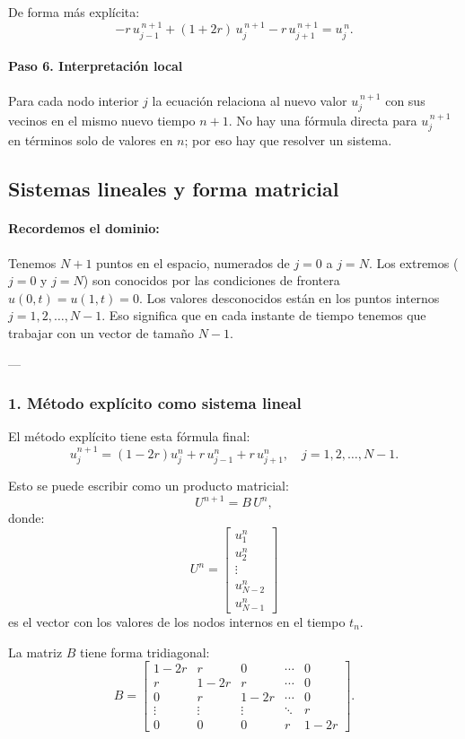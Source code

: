 \documentclass[12pt,a4paper]{article}
\begin{document}
De forma más explícita:
\[
-r\,u_{j-1}^{\,n+1} + (1+2r)\,u_j^{\,n+1} - r\,u_{j+1}^{\,n+1} = u_j^{\,n}.
\]

\paragraph{Paso 6. Interpretación local}  
Para cada nodo interior \(j\) la ecuación relaciona al nuevo valor \(u_j^{\,n+1}\) con sus vecinos en el mismo nuevo tiempo \(n+1\). No hay una fórmula directa para \(u_j^{\,n+1}\) en términos solo de valores en \(n\); por eso hay que resolver un sistema.

\subsection{Sistemas lineales y forma matricial}
\paragraph{Recordemos el dominio:}
Tenemos \(N+1\) puntos en el espacio, numerados de \(j=0\) a \(j=N\).  
Los extremos (\(j=0\) y \(j=N\)) son conocidos por las condiciones de frontera \(u(0,t)=u(1,t)=0\).  
Los valores desconocidos están en los puntos internos \(j=1,2,\dots,N-1\).  
Eso significa que en cada instante de tiempo tenemos que trabajar con un vector de tamaño \(N-1\).

---

\subsubsection*{1. Método explícito como sistema lineal}

El método explícito tiene esta fórmula final:
\[
u_j^{n+1} = (1-2r)u_j^n + r\,u_{j-1}^n + r\,u_{j+1}^n, 
\quad j = 1, 2, \dots, N-1.
\]

Esto se puede escribir como un producto matricial:
\[
U^{n+1} = B\,U^n,
\]
donde:
\[
U^n = 
\begin{bmatrix}
u_1^n \\ u_2^n \\ \vdots \\ u_{N-2}^n \\ u_{N-1}^n
\end{bmatrix}
\]
es el vector con los valores de los nodos internos en el tiempo \(t_n\).

La matriz \(B\) tiene forma tridiagonal:
\[
B = 
\begin{bmatrix}
1-2r & r     & 0     & \cdots & 0 \\[4pt]
r     & 1-2r & r     & \cdots & 0 \\[4pt]
0     & r     & 1-2r & \cdots & 0 \\[4pt]
\vdots& \vdots& \vdots& \ddots & r \\[4pt]
0     & 0     & 0     & r      & 1-2r
\end{bmatrix}.
\]
\end{document}
